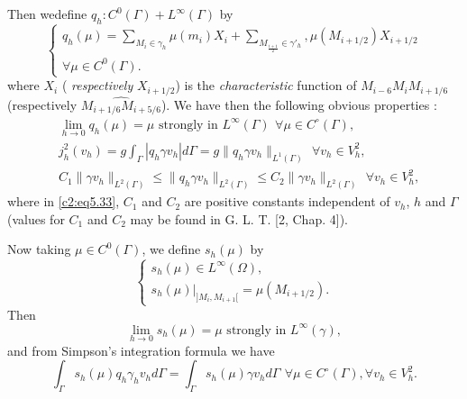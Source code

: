 Then we\pageoriginale  define $q_h : C^0 (\Gamma) + L^\infty (\Gamma)$ by 
\begin{equation}
\begin{cases}
q_h (\mu) = \sum\limits_{M_i \in \gamma_h} \mu (m_i) X_i +
\sum\limits_{M_\frac{i + 1}{2} {\in \gamma'_h}}, \mu(M_{i +1/ 2}) X_{i
  + 1/ 2}\\ 
\forall \mu \in C^0 (\Gamma).
\end{cases}
\tag{5.30}\label{c2:eq5.30}
\end{equation}
where $X_i$ (\textit{ respectively } $ X_{i + 1 / 2}$) is the
\textit{characteristic} function of \break $M_{i- 6}M_i M_{i +1/6}$
(respectively $\widehat{M_{i +1/6}M_{i + 5/6}}$). We have then the
following obvious properties : 
\begin{align}
& \lim_{h \to 0} q_h (\mu) = \mu \text{ strongly in } L^\infty
  (\Gamma) ~\, \forall  \mu \in C^\circ (\Gamma), \tag{5.31}\label{c2:eq5.31}\\ 
& j^2_h (v_h) = g \int_\Gamma |q_h \gamma v_h | d \Gamma = g \parallel  q_h
  \gamma v_h \parallel_{L ^1 (\Gamma)}~\, \forall  v_h \in V^2_h,
  \tag{5.32}\label{c2:eq5.32}\\ 
& C_1 \parallel  \gamma v_h \parallel_{L^2 (\Gamma ) } \leq \parallel  q_h \gamma v_h \parallel_{L^2
    (\Gamma)} \leq C_2 \parallel  \gamma v_h \parallel_{L^2 (\Gamma)} ~\, \forall  v_h
  \in V^2_h, \tag{5.33}\label{c2:eq5.33} 
\end{align}
where in \eqref{c2:eq5.33}, $C_1$ and $C_2$ are positive constants
independent of $v_h$, $h$ and $\Gamma$ (values for $C_1$ and $C_2$ may
be found in G. L. T. [2, Chap. 4]). 

Now taking $\mu \in C^0 (\Gamma)$, we define $s_h (\mu)$ by 
\begin{equation}
\begin{cases}
s_h (\mu) \in L^\infty (\Omega),\\
s_h (\mu)|_{] M_i , M_{i + 1}[} = \mu (M_{i + 1/ 2}).
\end{cases}
\tag{5.34}\label{c2:eq5.34}
\end{equation}
Then 
\begin{equation}
\lim_{h \to 0} s_h (\mu) = \mu \text{ strongly in } L^\infty (\gamma),
\tag{5.35}\label{c2:eq5.35} 
\end{equation}
and from Simpson's integration formula we have 
\begin{equation}
\int_\Gamma s_h (\mu ) q_h \gamma_h v_h d \Gamma = \int_\Gamma s_h
(\mu) \gamma v_h d \Gamma ~\, \forall  \mu \in C^\circ (\Gamma),
\forall v_h \in V^2_h. \tag{5.36}\label{c2:eq5.36} 
\end{equation}

